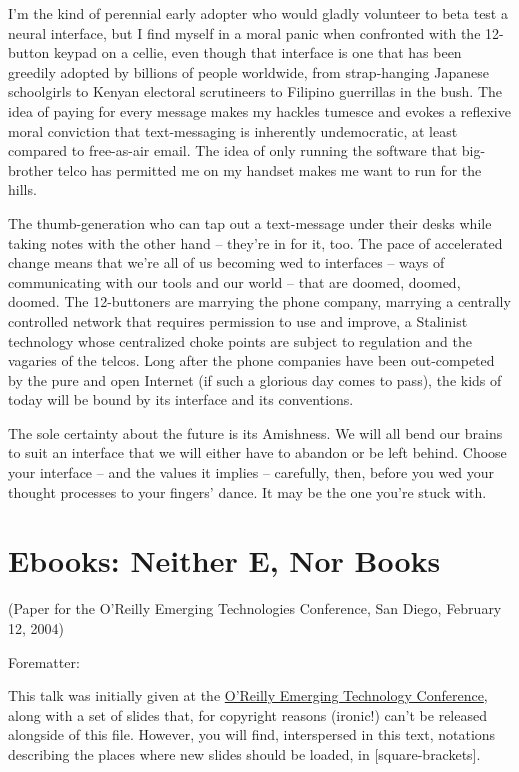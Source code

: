 I'm the kind of perennial early adopter who would gladly volunteer
to beta test a neural interface, but I find myself in a moral panic
when confronted with the 12-button keypad on a cellie, even though
that interface is one that has been greedily adopted by billions of
people worldwide, from strap-hanging Japanese schoolgirls to Kenyan
electoral scrutineers to Filipino guerrillas in the bush. The idea
of paying for every message makes my hackles tumesce and evokes a
reflexive moral conviction that text-messaging is inherently
undemocratic, at least compared to free-as-air email. The idea of
only running the software that big-brother telco has permitted me
on my handset makes me want to run for the hills.

The thumb-generation who can tap out a text-message under their
desks while taking notes with the other hand -- they're in for it,
too. The pace of accelerated change means that we're all of us
becoming wed to interfaces -- ways of communicating with our tools
and our world -- that are doomed, doomed, doomed. The 12-buttoners
are marrying the phone company, marrying a centrally controlled
network that requires permission to use and improve, a Stalinist
technology whose centralized choke points are subject to regulation
and the vagaries of the telcos. Long after the phone companies have
been out-competed by the pure and open Internet (if such a glorious
day comes to pass), the kids of today will be bound by its
interface and its conventions.

The sole certainty about the future is its Amishness. We will all
bend our brains to suit an interface that we will either have to
abandon or be left behind. Choose your interface -- and the values
it implies -- carefully, then, before you wed your thought
processes to your fingers' dance. It may be the one you're stuck
with.

\section{Ebooks: Neither E, Nor Books}

(Paper for the O'Reilly Emerging Technologies Conference, San
Diego, February 12, 2004)

Forematter:

This talk was initially given at the
\href{http://conferences.oreillynet.com/et2004}{O'Reilly Emerging
  Technology Conference},
along with a set of slides that, for copyright reasons (ironic!)
can't be released alongside of this file. However, you will find,
interspersed in this text, notations describing the places where
new slides should be loaded, in [square-brackets].

